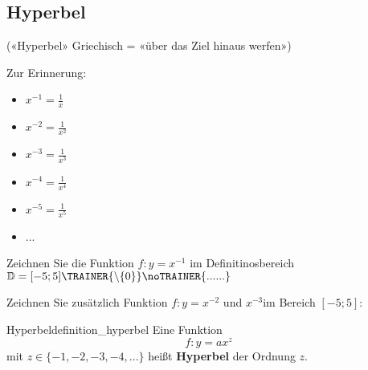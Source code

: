 
\subsection{Hyperbel}

(«Hyperbel» Griechisch = «über das Ziel hinaus werfen»)


Zur Erinnerung:
\begin{multicols}{2}
\begin{itemize}
	\item $x^{-1} = \frac{1}{x}$
	\item $x^{-2} = \frac{1}{x^2}$
	\item $x^{-3} = \frac{1}{x^3}$
	\item $x^{-4} = \frac{1}{x^4}$
	\item $x^{-5} = \frac{1}{x^5}$
  \item ...
\end{itemize}
\end{multicols}

Zeichnen Sie die Funktion $f: y = x^{-1}$ im Definitinosbereich
$\mathbb{D} = [-5;5]\TRAINER{\backslash \{0\}}\noTRAINER{......}$


\newpage


Zeichnen Sie zusätzlich Funktion $f: y = x^{-2}$  und $x^{-3}$im Bereich $[-5;5]$:


\begin{definition}{Hyperbel}{definition_hyperbel}
  Eine Funktion $$f: y=ax^z$$
  mit $z \in \{-1, -2, -3, -4, ...\}$ heißt
\textbf{Hyperbel} der Ordnung $z$.
\end{definition}

